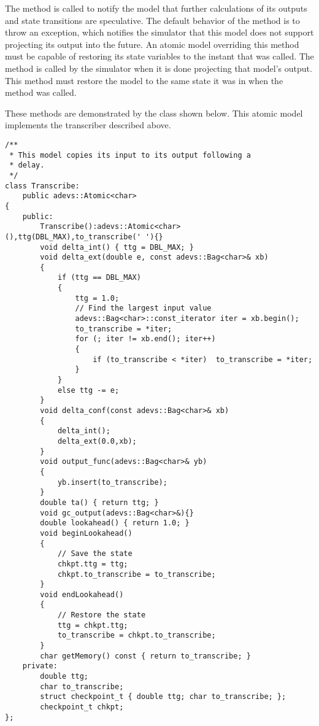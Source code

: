 The  method is called to notify the model that further calculations of its outputs and state transitions are speculative. The default behavior of the  method is to throw an exception, which notifies the simulator that this model does not support projecting its output into the future. An atomic model overriding this method must be capable of restoring its state variables to the instant that  was called. The  method is called by the simulator when it is done projecting that model's output. This method must restore the model to the same state it was in when the  method was called.

These methods are demonstrated by the  class shown below. This atomic model implements the transcriber described above.
\begin{verbatim}
/**
 * This model copies its input to its output following a
 * delay.
 */
class Transcribe:
    public adevs::Atomic<char>
{
    public:
        Transcribe():adevs::Atomic<char>(),ttg(DBL_MAX),to_transcribe(' '){}
        void delta_int() { ttg = DBL_MAX; }
        void delta_ext(double e, const adevs::Bag<char>& xb)
        {
            if (ttg == DBL_MAX)
            {
                ttg = 1.0;
                // Find the largest input value
                adevs::Bag<char>::const_iterator iter = xb.begin();
                to_transcribe = *iter;
                for (; iter != xb.end(); iter++)
                {
                    if (to_transcribe < *iter)  to_transcribe = *iter;
                }
            }
            else ttg -= e;
        }
        void delta_conf(const adevs::Bag<char>& xb)
        {
            delta_int();
            delta_ext(0.0,xb);
        }
        void output_func(adevs::Bag<char>& yb)
        {
            yb.insert(to_transcribe);
        }
        double ta() { return ttg; }
        void gc_output(adevs::Bag<char>&){}
        double lookahead() { return 1.0; }
        void beginLookahead()
        {
            // Save the state
            chkpt.ttg = ttg;
            chkpt.to_transcribe = to_transcribe;
        } 
        void endLookahead()
        {
            // Restore the state
            ttg = chkpt.ttg;
            to_transcribe = chkpt.to_transcribe;
        } 
        char getMemory() const { return to_transcribe; }
    private:
        double ttg;
        char to_transcribe;
        struct checkpoint_t { double ttg; char to_transcribe; };
        checkpoint_t chkpt;
};
\end{verbatim}
